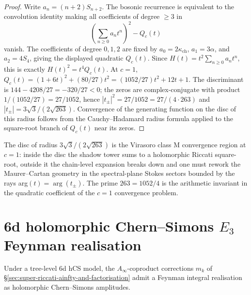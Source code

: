 \begin{proof}[Proof]
Write $a_n=(n+2)S_{n+2}$. The bosonic recurrence is equivalent to the
convolution identity making all coefficients of degree $\geq 3$ in
\[
\left(\sum_{n\geq 0}a_nt^n\right)^2-Q_c(t)
\]
vanish. The coefficients of degree $0,1,2$ are fixed by
$a_0=2\kappa_{\mathrm{ch}}$, $a_1=3\alpha$, and $a_2=4S_4$, giving
the displayed quadratic $Q_c(t)$. Since
$H(t)=t^2\sum_{n\geq 0}a_nt^n$, this is exactly
$H(t)^2=t^4Q_c(t)$. At $c=1$,
$Q_c(t)=(1+6t)^2+(80/27)t^2=(1052/27)t^2+12t+1$. The discriminant
is $144 - 4208/27 = -320/27 < 0$; the zeros are complex-conjugate with
product $1/(1052/27) = 27/1052$, hence
$|t_\pm|^2 = 27/1052 = 27/(4 \cdot 263)$ and
$|t_\pm| = 3\sqrt{3}/(2 \sqrt{263})$. Convergence of
the generating function on the disc of this radius follows from the
Cauchy--Hadamard radius formula applied to the square-root branch of
$Q_c(t)$ near its zeros.
\end{proof}

\begin{remark}
\label{rem:class-M-convergence-disc}
The disc of radius $3\sqrt{3}/(2\sqrt{263})$ is the Virasoro class M
convergence region at $c = 1$: inside the disc the shadow tower sums
to a holomorphic Riccati square-root, outside it the chain-level
expansion breaks down and one must rework the Maurer--Cartan geometry
in the spectral-plane Stokes sectors bounded by the rays arg$(t) =
\arg(t_\pm)$. The prime $263 = 1052/4$ is the arithmetic invariant in
the quadratic coefficient of the $c = 1$ convergence problem.
\end{remark}

\section{6d holomorphic Chern--Simons \texorpdfstring{$E_3$}{E-3} Feynman realisation}
\label{sec:super-riccati-6d-hcs-feynman}

Under a tree-level 6d hCS model, the $A_\infty$-coproduct corrections
$m_k$ of \S\ref{sec:super-riccati-ainfty-and-factorisation} admit a
Feynman integral realisation as holomorphic Chern--Simons amplitudes.

